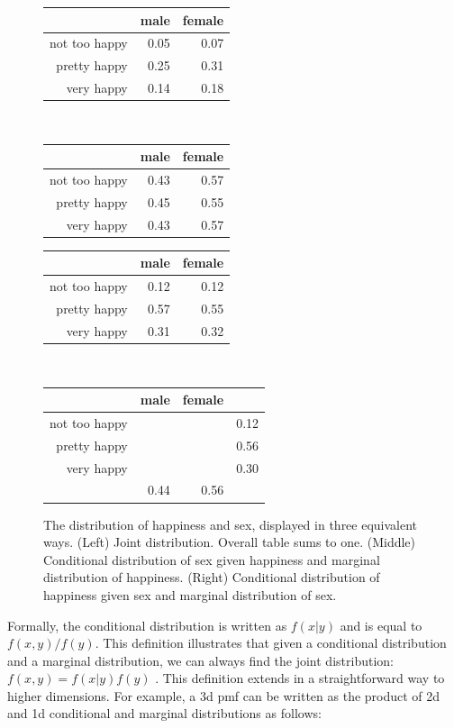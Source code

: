 \documentclass[journal]{vgtc}
\begin{document}
\begin{figure}[ht]
  \begin{tabular}{rrr}
  \toprule
  & male & female \\ 
  \midrule
  not too happy & 0.05 & 0.07 \\ 
  pretty happy & 0.25 & 0.31 \\ 
  very happy & 0.14 & 0.18 \\ 
  \bottomrule
  \end{tabular}
  \\[1em]

  \begin{tabular}{rrr}
  \toprule
  & male & female \\
  \midrule
  not too happy & 0.43 & 0.57 \\
  pretty happy & 0.45 & 0.55 \\ 
  very happy & 0.43 & 0.57 \\
  \bottomrule
  \end{tabular}\hspace{1em}%
  \begin{tabular}{rrr}
  \toprule
  & male & female \\ 
  \midrule
  not too happy & 0.12 & 0.12 \\ 
  pretty happy & 0.57 & 0.55 \\ 
  very happy & 0.31 & 0.32 \\
  \bottomrule
  \end{tabular}
  \\[1em]

  \begin{tabular}{rrrr}
  \toprule
  & male & female & \\ 
  \midrule
  not too happy & & & 0.12 \\ 
  pretty happy & & & 0.56 \\ 
  very happy & & & 0.30 \\
  & 0.44 & 0.56 \\ 
  \bottomrule
  \end{tabular}

  \caption{The distribution of happiness and sex, displayed in three equivalent ways.  (Left) Joint distribution. Overall table sums to one. (Middle) Conditional distribution of sex given happiness and marginal distribution of happiness. (Right) Conditional distribution of happiness given sex and marginal distribution of sex.}
  \label{fig:2d-table}
\end{figure}

Formally, the conditional distribution is written as $f(x | y)$ and is equal to $f(x, y) / f(y)$. This definition illustrates that given a conditional distribution and a marginal distribution, we can always find the joint distribution: $f(x, y) = f(x | y) f(y)$ \footnotemark. This definition extends in a straightforward way to higher dimensions. For example, a 3d pmf can be written as the product of 2d and 1d conditional and marginal distributions as follows:
\end{document}
